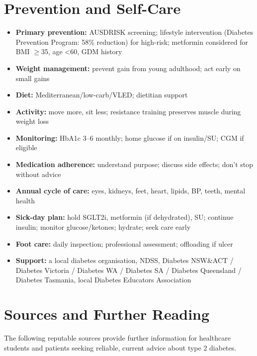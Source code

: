 \section*{Prevention and Self-Care}
\begin{itemize}
    \item \textbf{Primary prevention:} AUSDRISK screening; lifestyle intervention (Diabetes Prevention Program: 58\% reduction) for high-risk; metformin considered for BMI $\ge$35, age <60, GDM history
    \item \textbf{Weight management:} prevent gain from young adulthood; act early on small gains
    \item \textbf{Diet:} Mediterranean/low-carb/VLED; dietitian support
    \item \textbf{Activity:} move more, sit less; resistance training preserves muscle during weight loss
    \item \textbf{Monitoring:} HbA1c 3--6 monthly; home glucose if on insulin/SU; CGM if eligible
    \item \textbf{Medication adherence:} understand purpose; discuss side effects; don't stop without advice
    \item \textbf{Annual cycle of care:} eyes, kidneys, feet, heart, lipids, BP, teeth, mental health
    \item \textbf{Sick-day plan:} hold SGLT2i, metformin (if dehydrated), SU; continue insulin; monitor glucose/ketones; hydrate; seek care early
    \item \textbf{Foot care:} daily inspection; professional assessment; offloading if ulcer
    \item \textbf{Support:} a local diabetes organisation, NDSS, Diabetes NSW\&ACT / Diabetes Victoria / Diabetes WA / Diabetes SA / Diabetes Queensland / Diabetes Tasmania, local Diabetes Educators Association
\end{itemize}

\section*{Sources and Further Reading}
The following reputable sources provide further information for healthcare students and patients seeking reliable, current advice about type 2 diabetes.

